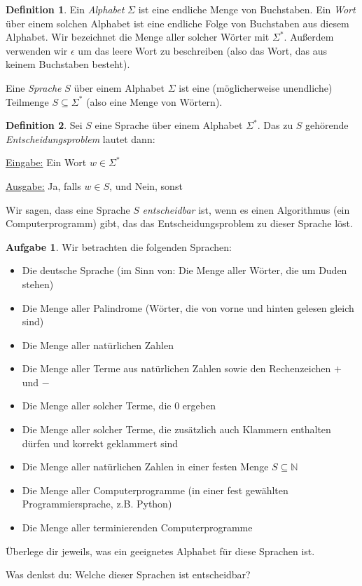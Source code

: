 \documentclass[a4paper,ngerman,12pt]{scrartcl}
\newcommand{\IN}{\mathbb{N}}
\theoremstyle{definition}
\newtheorem{defn}{Definition}[]
\newtheorem{aufg}{Aufgabe}
\theoremstyle{plain}
\theoremstyle{remark}
\begin{document}
\begin{defn}
	Ein \emph{Alphabet} $\Sigma$ ist eine endliche Menge von Buchstaben. Ein \emph{Wort} über einem solchen Alphabet ist eine endliche Folge von Buchstaben aus diesem Alphabet. Wir bezeichnet die Menge aller solcher Wörter mit $\Sigma^*$. Außerdem verwenden wir $\epsilon$ um das leere Wort zu beschreiben (also das Wort, das aus keinem Buchstaben besteht).
	
	Eine \emph{Sprache} $S$ über einem Alphabet $\Sigma$ ist eine (möglicherweise unendliche) Teilmenge $S \subseteq \Sigma^*$ (also eine Menge von Wörtern).
\end{defn}

\begin{defn}
	Sei $S$ eine Sprache über einem Alphabet $\Sigma^*$. Das zu $S$ gehörende \emph{Entscheidungsproblem} lautet dann:
	
	\underline{Eingabe:} Ein Wort $w \in \Sigma^*$
	
	\underline{Ausgabe:} Ja, falls $w \in S$, und Nein, sonst
	
	Wir sagen, dass eine Sprache $S$ \emph{entscheidbar} ist, wenn es einen Algorithmus (ein Computerprogramm) gibt, das das Entscheidungsproblem zu dieser Sprache löst.
\end{defn}

\begin{aufg}
	Wir betrachten die folgenden Sprachen:
	\begin{itemize}
		\item Die deutsche Sprache (im Sinn von: Die Menge aller Wörter, die um Duden stehen)
		\item Die Menge aller Palindrome (Wörter, die von vorne und hinten gelesen gleich sind)
		\item Die Menge aller natürlichen Zahlen
		\item Die Menge aller Terme aus natürlichen Zahlen sowie den Rechenzeichen $+$ und $-$
		\item Die Menge aller solcher Terme, die $0$ ergeben
		\item Die Menge aller solcher Terme, die zusätzlich auch Klammern enthalten dürfen und korrekt geklammert sind
		\item Die Menge aller natürlichen Zahlen in einer festen Menge $S \subseteq \IN$
		\item Die Menge aller Computerprogramme (in einer fest gewählten Programmiersprache, z.B. Python)
		\item Die Menge aller terminierenden Computerprogramme
	\end{itemize}
	Überlege dir jeweils, was ein geeignetes Alphabet für diese Sprachen ist.
	
	Was denkst du: Welche dieser Sprachen ist entscheidbar?
\end{aufg}
\end{document}
